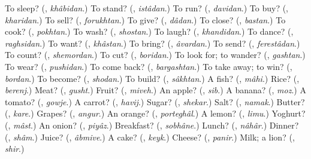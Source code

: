 \begin{tcolorbox}[breakable,colback=teal!4,colframe=teal!35!black,title={Before you move on}]
To sleep? (\textbf{}, \emph{khâbidan}.) To stand? (\textbf{}, \emph{istâdan}.) To run? (\textbf{}, \emph{davidan}.) To buy? (\textbf{}, \emph{kharidan}.) To sell? (\textbf{}, \emph{forukhtan}.) To give? (\textbf{}, \emph{dâdan}.) To close? (\textbf{}, \emph{bastan}.) To cook? (\textbf{}, \emph{pokhtan}.) To wash? (\textbf{}, \emph{shostan}.) To laugh? (\textbf{}, \emph{khandidan}.) To dance? (\textbf{}, \emph{raghsidan}.) To want? (\textbf{}, \emph{khâstan}.) To bring? (\textbf{}, \emph{âvardan}.) To send? (\textbf{}, \emph{ferestâdan}.) To count? (\textbf{}, \emph{shemordan}.) To cut? (\textbf{}, \emph{boridan}.) To look for; to wander? (\textbf{}, \emph{gashtan}.) To wear? (\textbf{}, \emph{pushidan}.) To come back? (\textbf{}, \emph{bargashtan}.) To take away; to win? (\textbf{}, \emph{bordan}.) To become? (\textbf{}, \emph{shodan}.) To build? (\textbf{}, \emph{sâkhtan}.) A fish? (\textbf{}, \emph{mâhi}.) Rice? (\textbf{}, \emph{berenj}.) Meat? (\textbf{}, \emph{gusht}.) Fruit? (\textbf{}, \emph{miveh}.) An apple? (\textbf{}, \emph{sib}.) A banana? (\textbf{}, \emph{moz}.) A tomato? (\textbf{}, \emph{gowje}.) A carrot? (\textbf{}, \emph{havij}.) Sugar? (\textbf{}, \emph{shekar}.) Salt? (\textbf{}, \emph{namak}.) Butter? (\textbf{}, \emph{kare}.) Grapes? (\textbf{}, \emph{angur}.) An orange? (\textbf{}, \emph{porteghâl}.) A lemon? (\textbf{}, \emph{limu}.) Yoghurt? (\textbf{}, \emph{mâst}.) An onion? (\textbf{}, \emph{piyâz}.) Breakfast? (\textbf{}, \emph{sobhâne}.) Lunch? (\textbf{}, \emph{nâhâr}.) Dinner? (\textbf{}, \emph{shâm}.) Juice? (\textbf{}, \emph{âbmive}.) A cake? (\textbf{}, \emph{keyk}.) Cheese? (\textbf{}, \emph{panir}.) Milk; a lion? (\textbf{}, \emph{shir}.)
\end{tcolorbox}
